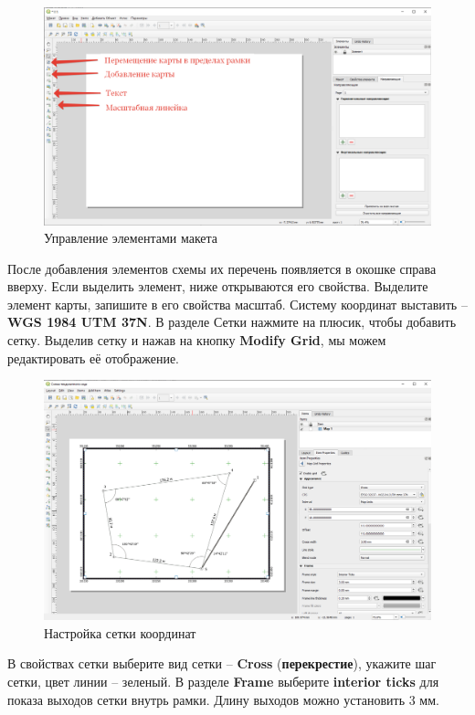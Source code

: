 \documentclass[
  12pt,
]{book}
\begin{document}
\begin{figure}
\centering
\includegraphics{images/Symbology/Map_elements.png}
\caption{Управление элементами макета}
\end{figure}

После добавления элементов схемы их перечень появляется в окошке справа вверху. Если выделить элемент, ниже открываются его свойства. Выделите элемент карты, запишите в его свойства масштаб. Систему координат выставить -- \textbf{WGS 1984 UTM 37N}. В разделе Сетки нажмите на плюсик, чтобы добавить сетку. Выделив сетку и нажав на кнопку \textbf{Modify Grid}, мы можем редактировать её отображение.

\begin{figure}
\centering
\includegraphics{images/Practice/Grid_settings.png}
\caption{Настройка сетки координат}
\end{figure}

В свойствах сетки выберите вид сетки -- \textbf{Cross} (\textbf{перекрестие}), укажите шаг сетки, цвет линии -- зеленый. В разделе \textbf{Frame} выберите \textbf{interior ticks} для показа выходов сетки внутрь рамки. Длину выходов можно установить 3 мм.
\end{document}
